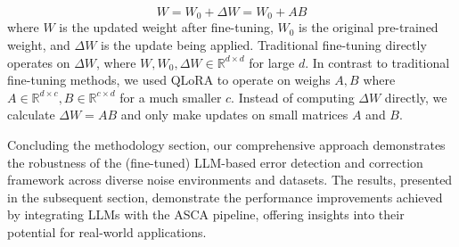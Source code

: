 \begin{equation}
    W = W_0 + \Delta W = W_0 + AB
\label{eq:lora_update}
\end{equation}
where $W$ is the updated weight after fine-tuning, $W_0$ is the original pre-trained weight, and $\Delta W$ is the update being applied. Traditional fine-tuning directly operates on $\Delta W$, where $W, W_0, \Delta W \in \mathbb{R}^{d\times d}$ for large $d$. In contrast to traditional fine-tuning methods, we used QLoRA to operate on weighs $A, B$ where $A \in \mathbb{R}^{d\times c}, B \in \mathbb{R}^{c\times d}$ for a much smaller $c$. Instead of computing $\Delta W$ directly, we calculate $\Delta W = AB$ and only make updates on small matrices $A$ and $B$.
\par
Concluding the methodology section, our comprehensive approach demonstrates the robustness of the (fine-tuned) LLM-based error detection and correction framework across diverse noise environments and datasets. 
The results, presented in the subsequent section, demonstrate the performance improvements achieved by integrating LLMs with the ASCA pipeline, offering insights into their potential for real-world applications.
